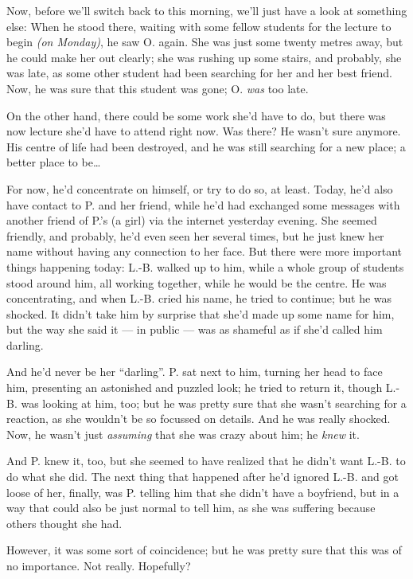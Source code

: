 Now, before we'll switch back to this morning, we'll just have a look at something else: When he stood there, waiting with some fellow students for the lecture to begin \emph{(on Monday)}, he saw O. again. She was just some twenty metres away, but he could make her out clearly; she was rushing up some stairs, and probably, she was late, as some other student had been searching for her and her best friend. Now, he was sure that this student was gone; O. \emph{was} too late.

On the other hand, there could be some work she'd have to do, but there was now lecture she'd have to attend right now. Was there? He wasn't sure anymore. 
His centre of life had been destroyed, and he was still searching for a new place; a better place to be\ldots

For now, he'd concentrate on himself, or try to do so, at least. Today, he'd also have contact to P. and her friend, while he'd had exchanged some messages with another friend of P.'s (a girl) via the internet yesterday evening. She seemed friendly, and probably, he'd even seen her several times, but he just knew her name without having any connection to her face. 
But there were more important things happening today: L.-B. walked up to him, while a whole group of students stood around him, all working together, while he would be the centre. He was concentrating, and when L.-B. cried his name, he tried to continue; but he was shocked. It didn't take him by surprise that she'd made up some name for him, but the way she said it --- in public --- was as shameful as if she'd called him darling.

And he'd never be her \enquote{darling}. P. sat next to him, turning her head to face him, presenting an astonished and puzzled look; he tried to return it, though L.-B. was looking at him, too; but he was pretty sure that she wasn't searching for a reaction, as she wouldn't be so focussed on details. And he was really shocked. 
Now, he wasn't just \emph{assuming} that she was crazy about him; he \emph{knew} it.

And P. knew it, too, but she seemed to have realized that he didn't want L.-B. to do what she did. 
The next thing that happened after he'd ignored L.-B. and got loose of her, finally, was P. telling him that she didn't have a boyfriend, but in a way that could also be just normal to tell him, as she was suffering because others thought she had.

However, it was some sort of coincidence; but he was pretty sure that this was of no importance. 
Not really. 
Hopefully?

